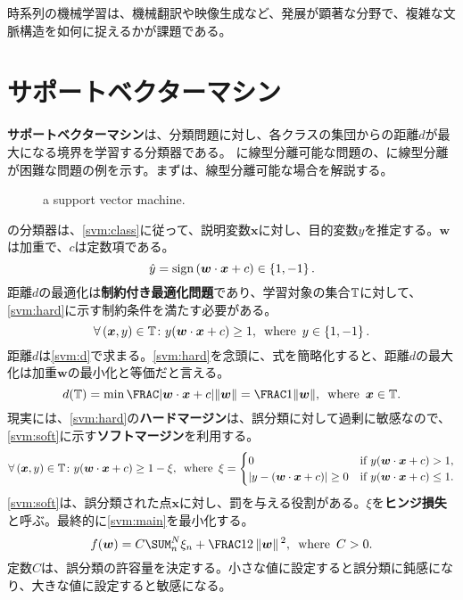 \documentclass[10pt,a4paper]{book}
\begin{document}
時系列の機械学習は、機械翻訳や映像生成など、発展が顕著な分野で、複雑な文脈構造を如何に捉えるかが課題である。

\chapter{サポートベクターマシン}

\textbf{サポートベクターマシン}は、分類問題に対し、各クラスの集団からの距離$d$が最大になる境界を学習する分類器である。
に線型分離可能な問題の、に線型分離が困難な問題の例を示す。まずは、線型分離可能な場合を解説する。

\begin{figure}[h]
\centering
{}
\caption{a support vector machine.\label{fig:svm}}
\end{figure}

の分類器は、\eqref{svm:class}に従って、説明変数$\bm{x}$に対し、目的変数$y$を推定する。$\bm{w}$は加重で、$c$は定数項である。
%
\begin{equation}
\label{eq:svm:class}
\hat{y} = \sign{\dprod{\bm{w}}{\bm{x}}+c} \in \seq{1,-1}.
\end{equation}
%
距離$d$の最適化は\textbf{制約付き最適化問題}であり、学習対象の集合$\mathbb{T}$に対して、\eqref{svm:hard}に示す制約条件を満たす必要がある。
%
\begin{equation}
\label{eq:svm:hard}
\forall \pair{\bm{x}}{y} \in \TRAIN \colon y(\dprod{\bm{w}}{\bm{x}} + c) \geq 1,
\where
y\in\seq{1,-1}.
\end{equation}
%
距離$d$は\eqref{svm:d}で求まる。\eqref{svm:hard}を念頭に、式を簡略化すると、距離$d$の最大化は加重$\bm{w}$の最小化と等価だと言える。
%
\begin{equation}
\label{eq:svm:d}
d(\TRAIN) = \min\frac{\abs{\dprod{\bm{w}}{\bm{x}} + c}}{\norm{\bm{w}}} = \frac{1}{\norm{\bm{w}}},
\where
\bm{x}\in\TRAIN.
\end{equation}
%
現実には、\eqref{svm:hard}の\textbf{ハードマージン}は、誤分類に対して過剰に敏感なので、\eqref{svm:soft}に示す\textbf{ソフトマージン}を利用する。
%
\begin{equation}
\label{eq:svm:soft}
\forall \pair{\bm{x}}{y} \in \TRAIN \colon
y (\dprod{\bm{w}}{\bm{x}} + c) \geq 1 - \xi,
\where
\xi =
\begin{cases}
0 & \text{if $y(\dprod{\bm{w}}{\bm{x}} + c) > 1$}, \\
\abs{y - (\dprod{\bm{w}}{\bm{x}} + c)} \geq 0 & \text{if $y(\dprod{\bm{w}}{\bm{x}} + c) \leq 1$}.
\end{cases}
\end{equation}
%
\eqref{svm:soft}は、誤分類された点$\bm{x}$に対し、罰を与える役割がある。$\xi$を\textbf{ヒンジ損失}と呼ぶ。最終的に\eqref{svm:main}を最小化する。
%
\begin{equation}
\label{eq:svm:main}
f(\bm{w}) = C \sum_n^N \xi_n + \frac{1}{2}\norm{\bm{w}}^2,
\where
C>0.
\end{equation}
%
定数$C$は、誤分類の許容量を決定する。小さな値に設定すると誤分類に鈍感になり、大きな値に設定すると敏感になる。
\end{document}
